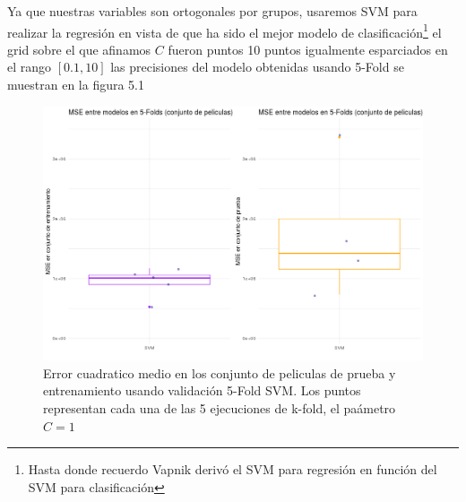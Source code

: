 \documentclass[paper=letter, fontsize=11pt]{scrartcl}
\numberwithin{equation}{section} %
\numberwithin{figure}{section} %
\numberwithin{table}{section} %
\begin{document}
\begin{enumerate}
Ya que nuestras variables son ortogonales por grupos, usaremos SVM para realizar la regresión en vista de que ha sido el mejor modelo de clasificación\footnote{Hasta donde recuerdo Vapnik derivó el SVM para regresión en función del SVM para clasificación} el grid sobre el que afinamos $C$ fueron puntos 10 puntos igualmente esparciados en el rango $[0.1, 10]$ las precisiones del modelo obtenidas usando 5-Fold se muestran en la figura 5.1\\


\begin{figure}[H]
  \begin{center}
    \includegraphics[scale =.7]{SVM5.png}
    \caption{Error cuadratico medio en los conjunto de peliculas de prueba y entrenamiento usando validación 5-Fold SVM. Los puntos representan cada una de las 5 ejecuciones de k-fold, el paámetro $C=1$}
    \label{figura4_1}
  \end{center}
\end{figure}
\end{enumerate}



\end{document}
